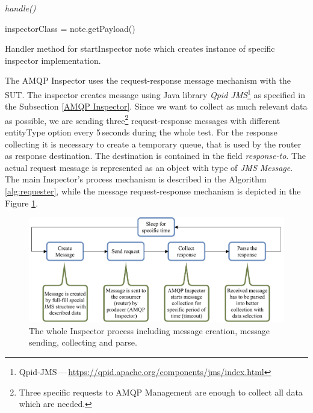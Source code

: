 \begin{center}
	\begin{algorithm}[H]
		\LinesNumbered
		\DontPrintSemicolon


		\fce \emph{handle()}\;

		\var inspectorClass = note.getPayload()\;


		 \caption{Handler method for startInspector note which creates instance of specific inspector implementation.}
		 \label{alg:startInspector}
	\end{algorithm}
\end{center}

The AMQP Inspector uses the request-response message mechanism with the SUT. The inspector creates message using Java library \emph{Qpid JMS}\footnote{Qpid-JMS\,---\,\url{https://qpid.apache.org/components/jms/index.html}} as specified in the Subsection \ref{AMQP Inspector}. Since we want to collect as much relevant data as possible, we are sending three\footnote{Three specific requests to AMQP Management are enough to collect all data which are needed.} request-response messages with different entityType option every 5\,seconds during the whole test. For the response collecting it is necessary to create a temporary queue, that is used by the router as response destination. The destination is contained in the field \emph{response-to}. The actual request message is represented as an object with type of \emph{JMS Message}. The main Inspector's process mechanism is described in the Algorithm \ref{alg:requester}, while the message request-response mechanism is depicted in the Figure \ref{fig:collector}.

\begin{figure}[H]
  \centering
  \includegraphics[width=15cm]{obrazky-figures/inspector_collector.pdf}
  \caption{The whole Inspector process including message creation, message sending, collecting and parse.}
  \label{fig:collector}
\end{figure}

